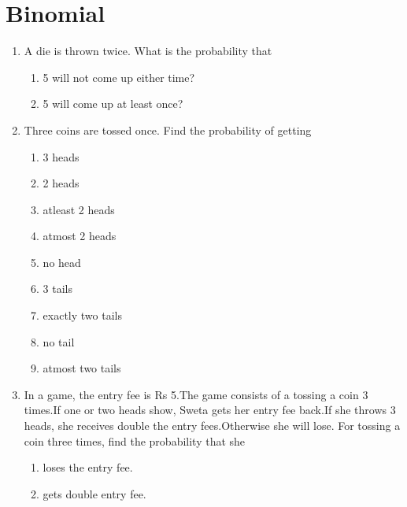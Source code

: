 	\section{Binomial}
\begin{enumerate}[label=\thesection.\arabic*,ref=\thesection.\theenumi]
\item A die is thrown twice. What is the probability that
\begin{enumerate}[font=\large\bfseries]
	\item 5 will not come up either time? 
	\item 5 will come up at least once?
\end{enumerate}
\solution

  \item Three coins are tossed once. Find the probability of getting 
    \begin{enumerate}
        \item 3 heads
        \item 2 heads
        \item atleast 2 heads 
        \item atmost 2 heads
        \item no head
        \item 3 tails 
        \item exactly two tails
        \item no tail
        \item atmost two tails
    \end{enumerate}
\solution

\item In a game, the entry fee is Rs 5.The game consists of a tossing a coin 3 times.If one or two heads show, Sweta gets her entry fee back.If she throws 3 heads, she receives double the entry fees.Otherwise she will lose. For tossing a coin three times, find the probability that she 
\begin{enumerate}
	\item loses the entry fee.

	\item gets double entry fee.


\end{enumerate}
\end{enumerate}
